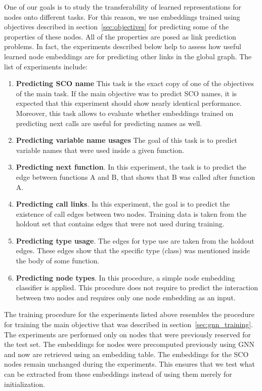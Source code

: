 \documentclass[a4paper,twoside]{article}
\begin{document}
One of our goals is to study the transferability of learned representations for nodes onto different tasks. For this reason, we use embeddings trained using objectives described in section~\ref{sec:objectives} for predicting some of the properties of these nodes. All of the properties are posed as link prediction problems. In fact, the experiments described below help to assess how useful learned node embeddings are for predicting other links in the global graph. The list of experiments include:
\begin{enumerate}
    \item \textbf{Predicting SCO name} 
    This task is the exact copy of one of the objectives of the main task. If the main objective was to predict SCO names, it is expected that this experiment should show nearly identical performance. Moreover, this task allows to evaluate whether embeddings trained on predicting next calls are useful for predicting names as well. 
    \item \textbf{Predicting variable name usages}
    The goal of this task is to predict variable names that were used inside a given function.
    \item \textbf{Predicting next function}.
    In this experiment, the task is to predict the edge between functions A and B, that shows that B was called after function A. 
    \item \textbf{Predicting call links}. 
    In this experiment, the goal is to predict the existence of call edges between two nodes. Training data is taken from the holdout set that contains edges that were not used during training. 
    \item \textbf{Predicting type usage}.
    The edges for type use are taken from the holdout edges. These edges show that the specific type (class) was mentioned inside the body of some function. 
    \item \textbf{Predicting node types}.
    In this procedure, a simple node embedding classifier is applied. This procedure does not require to predict the interaction between two nodes and requires only one node embedding as an input. 
\end{enumerate}

The training procedure for the experiments listed above resembles the procedure for training the main objective that was described in section~\ref{sec:gnn_training}. The experiments are performed only on nodes that were previously reserved for the test set. The embeddings for nodes were precomputed previously using GNN and now are retrieved using an embedding table. The embeddings for the SCO nodes remain unchanged during the experiments. This ensures that we test what can be extracted from these embeddings instead of using them merely for initialization. 
\end{document}
